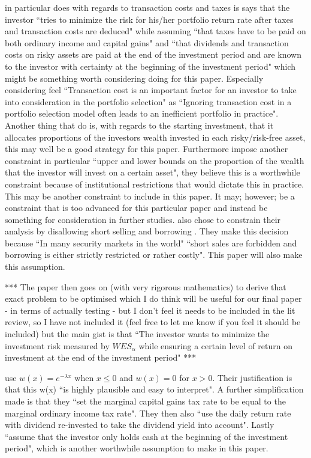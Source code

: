 \documentclass[12pt,a4paper]{article}
\begin{document}
\cite{CHEN20111777} in particular does with regards to transaction costs and taxes is says that the investor ``tries to minimize the risk for his/her portfolio return rate after
taxes and transaction costs are deduced" while assuming ``that taxes have to be paid on both ordinary income and capital gains" and ``that dividends and transaction costs on risky assets are paid at the end of the investment period and are known to the investor with certainty at the beginning of the investment period" which might be something worth considering doing for this paper. Especially considering \cite{CHEN20111777} feel ``Transaction cost is an important factor for an investor to take into consideration in the portfolio selection" as ``Ignoring transaction cost in a portfolio selection model often leads to an inefficient portfolio in practice". Another thing that \cite{CHEN20111777} do is, with regards to the starting investment, that it allocates proportions of the investors wealth invested in each risky/risk-free asset, this may well be a good strategy for this paper. Furthermore \cite{CHEN20111777} impose another constraint in particular ``upper and lower bounds on the proportion of the wealth that the investor will invest on a certain asset", they believe this is a worthwhile constraint because of institutional
restrictions that would dictate this in practice. This may be another constraint to include in this paper. It may; however; be a constraint that is too advanced for this particular paper and instead be something for consideration in further studies. \cite{CHEN20111777} also chose to constrain their analysis by disallowing short selling and borrowing . They make this decision because ``In many security markets in the world" ``short sales are forbidden and borrowing is either strictly restricted or rather costly". This paper will also make this assumption. 
 
*** The paper then goes on (with very rigorous mathematics) to derive that exact problem to be optimised which I do think will be useful for our final paper - in terms of actually testing - but I don't feel it needs to be included in the lit review, so I have not included it (feel free to let me know if you feel it should be included) but the main gist is that ``The investor wants to minimize the investment risk measured by $WES_{\alpha}$ while ensuring a certain level of return on
investment at the end of the investment period" ***

 \cite{CHEN20111777} use $w(x)= e^{-\lambda x}$ when  $ x \leq 0 $ and $w(x) = 0$ for $x > 0 $. Their justification is that this w(x) ``is highly plausible and easy to interpret". A further simplification made is that they ``set the marginal capital gains tax rate to be equal to the marginal ordinary income tax rate". They then also ``use the daily return rate with dividend re-invested to take the dividend yield into account". Lastly  \cite{CHEN20111777} ``assume that the investor only holds cash at the beginning of the investment period", which is another worthwhile assumption to make in this paper. 
 
\end{document}
